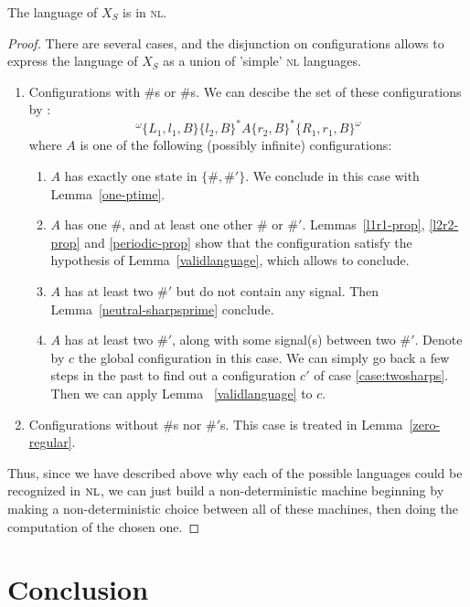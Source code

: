 \documentclass{jac}
\theoremstyle{definition}
\begin{document}
\begin{proposition}
\label{prop:simplefirelimit}
The language of $X_S$ is in \textsc{nl}.
\begin{proof}
  There are several cases, and the disjunction on configurations allows to express
  the language of $X_S$ as a union of 'simple' \textsc{nl} languages.
  \begin{enumerate}
    \item Configurations with $\#$s or $\#$s. We can descibe the set of
      these configurations by :
      \[^\omega\{L_1,l_1,B\}\{l_2,B\}^*A\{r_2,B\}^*\{R_1,r_1,B\}^\omega\]
      where $A$ is one of the following (possibly infinite) configurations:
      \begin{enumerate}
      \item $A$ has exactly one state in $\{\#,\#'\}$.
        We conclude in this case with Lemma~\ref{one-ptime}.
      \item $A$ has one $\#$, and at least one other $\#$ or
        $\#'$. Lemmas~\ref{l1r1-prop}, \ref{l2r2-prop} and
        \ref{periodic-prop} show that the configuration satisfy the
        hypothesis of Lemma~\ref{validlanguage}, which allows to
        conclude.\label{case:twosharps}
      \item $A$ has at least two $\#'$ but do not contain any signal.
        Then Lemma~\ref{neutral-sharpsprime} conclude.
      \item $A$ has at least two $\#'$, along with some signal(s)
        between two $\#'$. Denote by $c$ the global configuration in
        this case.  We can simply go back a few steps in the past to
        find out a configuration $c'$ of case
        \ref{case:twosharps}. Then we can apply Lemma
       ~\ref{validlanguage} to $c$.
      \end{enumerate}
    \item Configurations without $\#$s nor $\#'$s. This case is treated in
      Lemma~\ref{zero-regular}.
  \end{enumerate}
  Thus, since we have described above why each of the possible languages could be recognized
  in $\textsc{nl}$, we can just build a non-deterministic machine beginning by making a
  non-deterministic choice between all of these machines, then doing the
  computation of the chosen one.
\end{proof}

\end{proposition}



\section*{Conclusion}\label{sec:persp}
\end{document}
